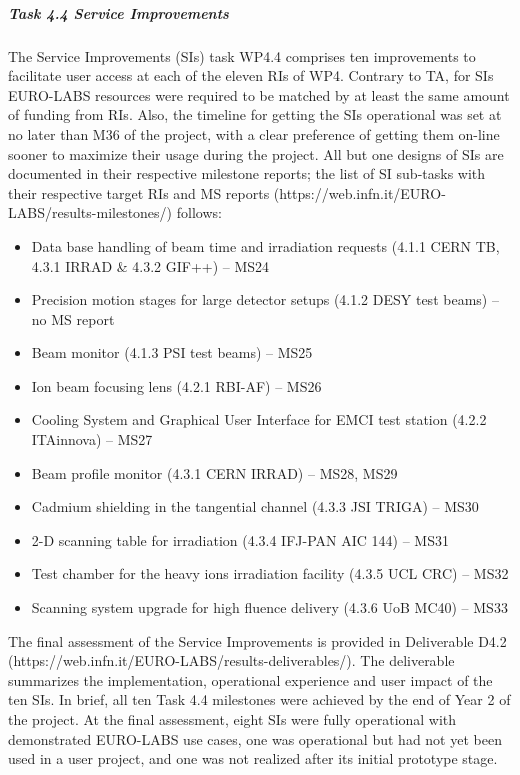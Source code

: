 \subparagraph{Task 4.4 Service Improvements} \mbox{}

The Service Improvements (SIs) task WP4.4 comprises ten improvements to facilitate user access at each of the eleven RIs of WP4. Contrary to TA, for SIs EURO-LABS resources were required to be matched by at least the same amount of funding from RIs. Also, the timeline for getting the SIs operational was set at no later than M36 of the project, with a clear preference of getting them on-line sooner to maximize their usage during the project. All but one designs of SIs are documented in their respective milestone reports; the list of SI sub-tasks with their respective target RIs and MS reports (https://web.infn.it/EURO-LABS/results-milestones/) follows:
\begin{itemize}
    \item
[4.4.1]	Data base handling of beam time and irradiation requests (4.1.1 CERN TB, 4.3.1 IRRAD \& 4.3.2 GIF++) – MS24
    \item
[4.4.2]	Precision motion stages for large detector setups (4.1.2 DESY test beams) – no MS report
    \item
[4.4.3]	Beam monitor (4.1.3 PSI test beams) – MS25
    \item
[4.4.4]	Ion beam focusing lens (4.2.1 RBI-AF) – MS26
    \item
[4.4.5]	Cooling System and Graphical User Interface for EMCI test station (4.2.2 ITAinnova) – MS27
    \item
[4.4.6]	Beam profile monitor (4.3.1 CERN IRRAD) – MS28, MS29
    \item
[4.4.7]	Cadmium shielding in the tangential channel (4.3.3 JSI TRIGA) – MS30
    \item
[4.4.8]	2-D scanning table for irradiation (4.3.4 IFJ-PAN AIC 144) – MS31
    \item
[4.4.9]	Test chamber for the heavy ions irradiation facility (4.3.5 UCL CRC) – MS32
    \item
[4.4.10]	Scanning system upgrade for high fluence delivery (4.3.6 UoB MC40) – MS33
\end{itemize}

The final assessment of the Service Improvements is provided in Deliverable D4.2 (https://web.infn.it/EURO-LABS/results-deliverables/). The deliverable summarizes the implementation, operational experience and user impact of the ten SIs.  In brief, all ten Task 4.4 milestones were achieved by the end of Year 2 of the project. At the final assessment, eight SIs were fully operational with demonstrated EURO-LABS use cases, one was operational but had not yet been used in a user project, and one was not realized after its initial prototype stage. 


